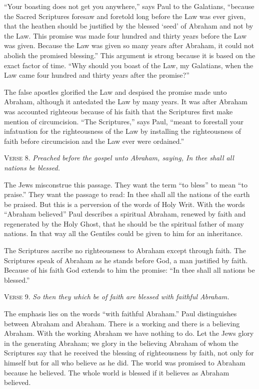 “Your boasting does not get you anywhere,” says Paul to the Galatians, “because the Sacred Scriptures foresaw and foretold long before the Law was ever given, that the heathen should be justified by the blessed ‘seed’ of Abraham and not by the Law. This promise was made four hundred and thirty years before the Law was given. Because the Law was given so many years after Abraham, it could not abolish the promised blessing.” This argument is strong because it is based on the exact factor of time. “Why should you boast of the Law, my Galatians, when the Law came four hundred and thirty years after the promise?”

The false apostles glorified the Law and despised the promise made unto Abraham, although it antedated the Law by many years. It was after Abraham was accounted righteous because of his faith that the Scriptures first make mention of circumcision. “The Scriptures,” says Paul, “meant to forestall your infatuation for the righteousness of the Law by installing the righteousness of faith before circumcision and the Law ever were ordained.”

\textsc{Verse} 8. \emph{Preached before the gospel unto Abraham, saying, In thee shall all nations be blessed.}

The Jews misconstrue this passage. They want the term “to bless” to mean “to praise.” They want the passage to read: In thee shall all the nations of the earth be praised. But this is a perversion of the words of Holy Writ. With the words “Abraham believed” Paul describes a spiritual Abraham, renewed by faith and regenerated by the Holy Ghost, that he should be the spiritual father of many nations. In that way all the Gentiles could be given to him for an inheritance.

The Scriptures ascribe no righteousness to Abraham except through faith. The Scriptures speak of Abraham as he stands before God, a man justified by faith. Because of his faith God extends to him the promise: “In thee shall all nations be blessed.”

\textsc{Verse} 9. \emph{So then they which be of faith are blessed with faithful Abraham.}

The emphasis lies on the words “with faithful Abraham.” Paul distinguishes between Abraham and Abraham. There is a working and there is a believing Abraham. With the working Abraham we have nothing to do. Let the Jews glory in the generating Abraham; we glory in the believing Abraham of whom the Scriptures say that he received the blessing of righteousness by faith, not only for himself but for all who believe as he did. The world was promised to Abraham because he believed. The whole world is blessed if it believes as Abraham believed.

